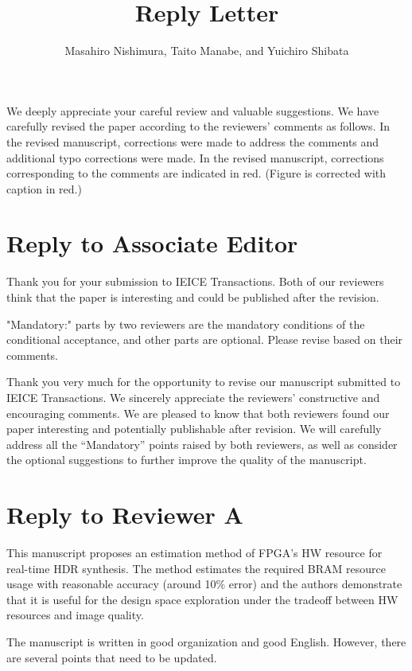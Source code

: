 \documentclass[a4j]{jsarticle}
\title{\bf \Large Reply Letter}
\author{Masahiro Nishimura, Taito Manabe, and Yuichiro Shibata}
\date{}
\begin{document}
\maketitle

We deeply appreciate your careful review and valuable suggestions.  
We have carefully revised the paper according to the reviewers' 
comments as follows.
In the revised manuscript, corrections were made to address the comments 
and additional typo corrections were made.
In the revised manuscript, corrections corresponding to the comments are indicated in red.
(Figure is corrected with caption in red.)
\section*{Reply to Associate Editor}
\begin{screen}
Thank you for your submission to IEICE Transactions. Both of our reviewers
think that the paper is interesting and could be published after the revision. 

"Mandatory:" parts by two reviewers are the mandatory conditions
of the conditional acceptance, and other parts are optional.
Please revise based on their comments.
\end{screen}
Thank you very much for the opportunity to revise 
our manuscript submitted to IEICE Transactions.
We sincerely appreciate the reviewers’ constructive and encouraging comments.
We are pleased to know that both reviewers found our paper interesting and 
potentially publishable after revision.
We will carefully address all the ``Mandatory'' points raised by both reviewers, 
as well as consider the optional suggestions to further improve the quality of 
the manuscript.


\section*{Reply to Reviewer A}

\begin{screen}
This manuscript proposes an estimation method of FPGA's HW resource for real-time HDR synthesis.
The method estimates the required BRAM resource usage with reasonable accuracy (around 10\% error)
and the authors demonstrate that it is useful for the design space exploration
under the tradeoff between HW resources and image quality.

The manuscript is written in good organization and good English.
However, there are several points that need to be updated.
\end{screen}
\end{document}
